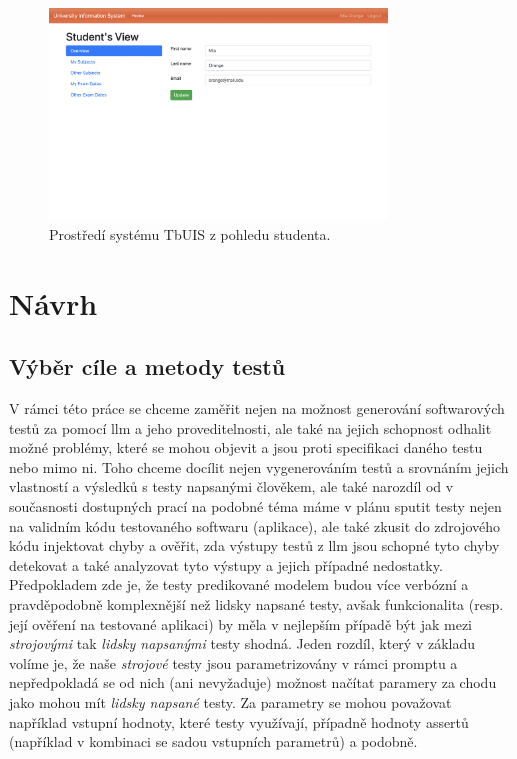 \documentclass[czech, ma, kiv, he, iso690alph, pdf, viewonly]{fasthesis}
\begin{document}
    \begin{figure}
        \includegraphics[width=0.8\textwidth]{pic/tbuis.png}
        \centering
        \caption{Prostředí systému TbUIS z pohledu studenta.}
        \label{fig:tbuis}
    \end{figure}

\chapter{Návrh}

        \section{Výběr cíle a metody testů} \label{sec:goals}
        V rámci této práce se chceme zaměřit nejen na možnost generování softwarových testů za pomocí \Gls{llm} a jeho proveditelnosti, ale také na jejich schopnost odhalit možné problémy, které se mohou objevit a jsou proti specifikaci daného testu nebo mimo ni. Toho chceme docílit nejen vygenerováním testů a srovnáním jejich vlastností a výsledků s testy napsanými člověkem, ale také narozdíl od v současnosti dostupných prací na podobné téma máme v plánu sputit testy nejen na validním kódu testovaného softwaru (aplikace), ale také zkusit do zdrojového kódu injektovat chyby a ověřit, zda výstupy testů z \Gls{llm} jsou schopné tyto chyby detekovat a také analyzovat tyto výstupy a jejich případné nedostatky. Předpokladem zde je, že testy predikované modelem budou více verbózní a pravděpodobně komplexnější než lidsky napsané testy, avšak funkcionalita (resp. její ověření na testované aplikaci) by měla v nejlepším případě být jak mezi \textit{strojovými} tak \textit{lidsky napsanými} testy shodná. Jeden rozdíl, který v základu volíme je, že naše \textit{strojové} testy jsou parametrizovány v rámci promptu a nepředpokladá se od nich (ani nevyžaduje) možnost načítat paramery za chodu jako mohou mít \textit{lidsky napsané} testy. Za parametry se mohou považovat například vstupní hodnoty, které testy využívají, případně hodnoty assertů (například v kombinaci se sadou vstupních parametrů) a podobně.
\end{document}
